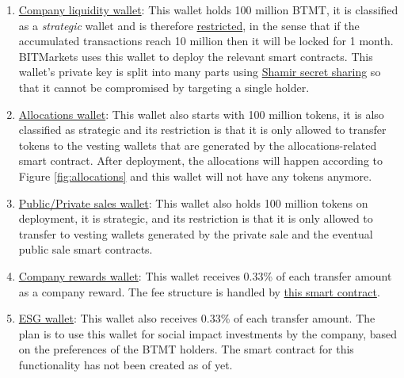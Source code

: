 \documentclass[a4paper,12pt]{article}
\begin{document}
\begin{enumerate}
  \item \label{wallet:liquidity} \href{https://mumbai.polygonscan.com/address/0x29faB37886099219ba80c578E0A21dD11f86851F}{Company liquidity wallet}: This wallet holds 100 million BTMT, it is classified as a \textit{strategic} wallet and is therefore \href{https://github.com/UAB-BITmarkets/token/blob/master/contracts/token/ERC20StrategicWalletRestrictions.sol}{restricted}, in the sense that if the accumulated transactions reach 10 million then it will be locked for 1 month. BITMarkets uses this wallet to deploy the relevant smart contracts. This wallet's private key is split into many parts using \href{https://en.wikipedia.org/wiki/Shamir\%27s_secret_sharing}{Shamir secret sharing} so that it cannot be compromised by targeting a single holder.

  \item \label{wallet:allocations} \href{https://mumbai.polygonscan.com/address/0x79ec4fd856AC42eF9f15d8B4A7Ec0cF3A136D062}{Allocations wallet}: This wallet also starts with 100 million tokens, it is also classified as strategic and its restriction is that it is only allowed to transfer tokens to the vesting wallets that are generated by the allocations-related smart contract. After deployment, the allocations will happen according to Figure \ref{fig:allocations} and this wallet will not have any tokens anymore.

  \item \label{wallet:crowdsales} \href{https://mumbai.polygonscan.com/address/0x9852e238Bcf28F4c918a3921f7aeb4df23cABCEa}{Public/Private sales wallet}: This wallet also holds 100 million tokens on deployment, it is strategic, and its restriction is that it is only allowed to transfer to vesting wallets generated by the private sale and the eventual public sale smart contracts.

  \item \label{wallet:rewards} \href{https://mumbai.polygonscan.com/address/0x90508C30Ea3Be576347F595a6d0A144ED8b9bC3c}{Company rewards wallet}: This wallet receives 0.33\% of each transfer amount as a company reward. The fee structure is handled by \href{https://github.com/UAB-BITmarkets/token/blob/master/contracts/token/ERC20Fees.sol}{this smart contract}.

  \item \label{wallet:esg} \href{https://mumbai.polygonscan.com/address/0x0c1DD3fbB5e173c65E4801b8D3780830F80fC5cD}{ESG wallet}: This wallet also receives 0.33\% of each transfer amount. The plan is to use this wallet for social impact investments by the company, based on the preferences of the BTMT holders. The smart contract for this functionality has not been created as of yet.


\end{enumerate}
\end{document}
